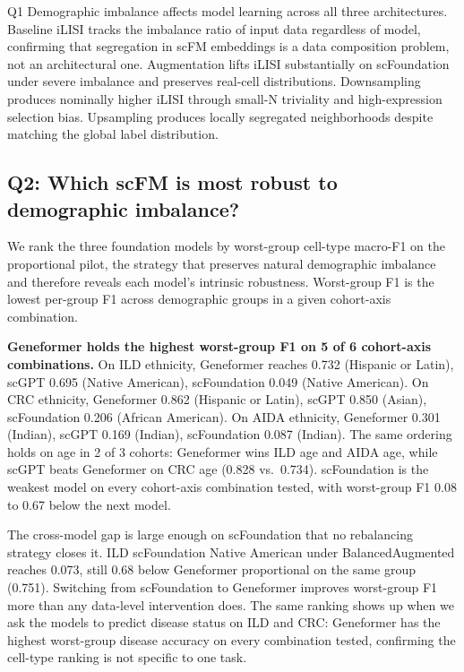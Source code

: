 \documentclass[sigconf]{acmart}
\begin{document}
\begin{answerbox}{Q1}
Demographic imbalance affects model learning across all three architectures. Baseline iLISI tracks the imbalance ratio of input data regardless of model, confirming that segregation in scFM embeddings is a data composition problem, not an architectural one. Augmentation lifts iLISI substantially on scFoundation under severe imbalance and preserves real-cell distributions. Downsampling produces nominally higher iLISI through small-N triviality and high-expression selection bias. Upsampling produces locally segregated neighborhoods despite matching the global label distribution.
\end{answerbox}

\subsection{Q2: Which scFM is most robust to demographic imbalance?}
\label{sec:q2}

We rank the three foundation models by worst-group cell-type macro-F1 on the proportional pilot, the strategy that preserves natural demographic imbalance and therefore reveals each model's intrinsic robustness. Worst-group F1 is the lowest per-group F1 across demographic groups in a given cohort-axis combination.

\textbf{Geneformer holds the highest worst-group F1 on 5 of 6 cohort-axis combinations.} On ILD ethnicity, Geneformer reaches 0.732 (Hispanic or Latin), scGPT 0.695 (Native American), scFoundation 0.049 (Native American). On CRC ethnicity, Geneformer 0.862 (Hispanic or Latin), scGPT 0.850 (Asian), scFoundation 0.206 (African American). On AIDA ethnicity, Geneformer 0.301 (Indian), scGPT 0.169 (Indian), scFoundation 0.087 (Indian). The same ordering holds on age in 2 of 3 cohorts: Geneformer wins ILD age and AIDA age, while scGPT beats Geneformer on CRC age (0.828 vs.\ 0.734). scFoundation is the weakest model on every cohort-axis combination tested, with worst-group F1 0.08 to 0.67 below the next model.

The cross-model gap is large enough on scFoundation that no rebalancing strategy closes it. ILD scFoundation Native American under BalancedAugmented reaches 0.073, still 0.68 below Geneformer proportional on the same group (0.751). Switching from scFoundation to Geneformer improves worst-group F1 more than any data-level intervention does. The same ranking shows up when we ask the models to predict disease status on ILD and CRC: Geneformer has the highest worst-group disease accuracy on every combination tested, confirming the cell-type ranking is not specific to one task.
\end{document}
